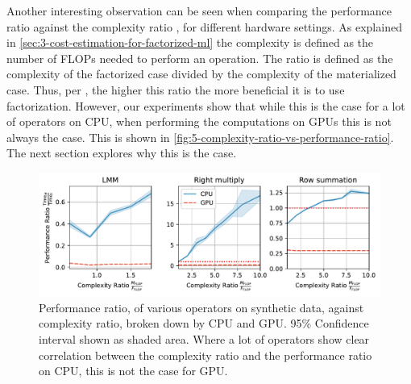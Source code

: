 Another interesting observation can be seen when comparing the performance ratio against the complexity ratio \cite{schijndel_cost_estimation}, for different hardware settings. As explained in \autoref{sec:3-cost-estimation-for-factorized-ml} the complexity is defined as the number of FLOPs needed to perform an operation. The ratio is defined as the complexity of the factorized case divided by the complexity of the materialized case. Thus, per \cite{schijndel_cost_estimation}, the higher this ratio the more beneficial it is to use factorization. However, our experiments show that while this is the case for a lot of operators on CPU, when performing the computations on GPUs this is not always the case. This is shown in \autoref{fig:5-complexity-ratio-vs-performance-ratio}. The next section explores why this is the case.

\begin{figure}[ht]
    \centering
    \includegraphics[width=\linewidth]{chapters/05_cost_estimation/figures/motivation_speedup_complexity_ratio.pdf}
    \caption[Performance ratio plotted against complexity ratio]{Performance ratio, of various operators on synthetic data, against complexity ratio, broken down by CPU and GPU. 95\% Confidence interval shown as shaded area. Where a lot of operators show clear correlation between the complexity ratio and the performance ratio on CPU, this is not the case for GPU.}
    \label{fig:5-complexity-ratio-vs-performance-ratio}
\end{figure}


